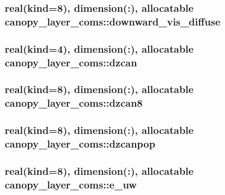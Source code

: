 \subsubsection[{downward\+\_\+vis\+\_\+diffuse}]{\setlength{\rightskip}{0pt plus 5cm}real(kind=8), dimension(\+:), allocatable canopy\+\_\+layer\+\_\+coms\+::downward\+\_\+vis\+\_\+diffuse}\label{namespacecanopy__layer__coms_a3daf45d80c36a9b92a031d8865ceb5a8}
\hypertarget{namespacecanopy__layer__coms_ad1c041ca993f51ff5ea10ae260a4aa7c}{}
\subsubsection[{dzcan}]{\setlength{\rightskip}{0pt plus 5cm}real(kind=4), dimension(\+:), allocatable canopy\+\_\+layer\+\_\+coms\+::dzcan}\label{namespacecanopy__layer__coms_ad1c041ca993f51ff5ea10ae260a4aa7c}
\hypertarget{namespacecanopy__layer__coms_acb5c656adc50de1c62378239816dd7c8}{}
\subsubsection[{dzcan8}]{\setlength{\rightskip}{0pt plus 5cm}real(kind=8), dimension(\+:), allocatable canopy\+\_\+layer\+\_\+coms\+::dzcan8}\label{namespacecanopy__layer__coms_acb5c656adc50de1c62378239816dd7c8}
\hypertarget{namespacecanopy__layer__coms_a2b048c0b2ff8eb8727cf9f8fe03106ce}{}
\subsubsection[{dzcanpop}]{\setlength{\rightskip}{0pt plus 5cm}real(kind=8), dimension(\+:), allocatable canopy\+\_\+layer\+\_\+coms\+::dzcanpop}\label{namespacecanopy__layer__coms_a2b048c0b2ff8eb8727cf9f8fe03106ce}
\hypertarget{namespacecanopy__layer__coms_aa70ec83b3221ee7aee0beedb704c2b9f}{}
\subsubsection[{e\+\_\+uw}]{\setlength{\rightskip}{0pt plus 5cm}real(kind=8), dimension(\+:), allocatable canopy\+\_\+layer\+\_\+coms\+::e\+\_\+uw}\label{namespacecanopy__layer__coms_aa70ec83b3221ee7aee0beedb704c2b9f}
\hypertarget{namespacecanopy__layer__coms_a6da88578161628f9096dbe2d61db4c3f}{}
